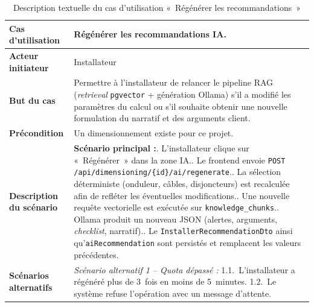 \begin{table}[H]
  \caption{Description textuelle du cas d'utilisation «~Régénérer les recommandations~»}
  \label{tab:cu-regenerer-reco}
  \centering
  \begin{tabularx}{\textwidth}{|L{3.8cm}|X|}
    \hline
    \textbf{Cas d'utilisation} & Régénérer les recommandations IA. \\
    \hline
    \textbf{Acteur initiateur} & Installateur \\
    \hline
    \textbf{But du cas} & Permettre à l'installateur de relancer le pipeline
      RAG (\textit{retrieval} \texttt{pgvector} + génération Ollama) s'il a
      modifié les paramètres du calcul ou s'il souhaite obtenir une nouvelle
      formulation du narratif et des arguments client. \\
    \hline
    \textbf{Précondition} & Un dimensionnement existe pour ce projet. \\
    \hline
    \textbf{Description du scénario} &
    \textbf{Scénario principal :}. L'installateur clique sur «~Régénérer~» dans la zone IA.. Le frontend envoie \texttt{POST /api/dimensioning/\{id\}/ai/regenerate}.. La sélection déterministe (onduleur, câbles, disjoncteurs) est
       recalculée afin de refléter les éventuelles modifications.. Une nouvelle requête vectorielle est exécutée sur \texttt{knowledge\_chunks}.. Ollama produit un nouveau JSON (alertes, arguments, \textit{checklist},
       narratif).. Le \texttt{InstallerRecommendationDto} ainsi qu'\texttt{aiRecommendation}
       sont persistés et remplacent les valeurs précédentes. \\
    \hline
    \textbf{Scénarios alternatifs} &
    \textit{Scénario alternatif 1 -- Quota dépassé :}\newline
    \hspace*{6pt}1.1.~L'installateur a régénéré plus de 3~fois en moins de 5~minutes.\newline
    \hspace*{6pt}1.2.~Le système refuse l'opération avec un message d'attente.\\
    \hline
  \end{tabularx}
\end{table}

